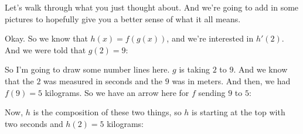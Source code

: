 \documentclass[pdftex, brazil, 12pt, twoside]{article}
\begin{document}
Let's walk through what you just thought about.
And we're going to add in some pictures
to hopefully give you a better sense of what it all means.

Okay.
So we know that $h(x) = f(g(x))$,
and we're interested in $h'(2)$.
And we were told that $g(2)=9$:

\begin{figure}[H]
  \begin{center}
  \end{center}
\end{figure}

So I'm going to draw some number lines here.
$g$ is taking $2$ to $9$.
And we know that the $2$ was measured in seconds
and the $9$ was in meters.
And then, we had $f(9)=5$ kilograms.
So we have an arrow here for $f$ sending $9$ to $5$:

\begin{figure}[H]
  \begin{center}
  \end{center}
\end{figure}

Now, $h$ is the composition of these two things,
so $h$ is starting at the top with two seconds and $h(2)=5$
kilograms:

\begin{figure}[H]
  \begin{center}
  \end{center}
\end{figure}
\end{document}
